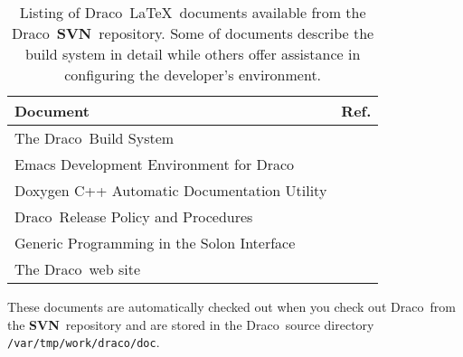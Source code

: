 \documentclass[11pt]{nmemo}
\newcommand{\comp}[1]{\normalfont\footnotesize\texttt{#1}\normalsize}
\newcommand{\draco}{{\normalfont\sffamily Draco}}
\newcommand{\svn}{{\normalfont\bfseries SVN}}
\begin{document}
\begin{table}
  \caption{Listing of \draco\ \LaTeX\ documents available from the
    \draco\ \svn\ repository.  Some of documents describe the build
    system in detail while others offer assistance in configuring the
    developer's environment.}
  \label{tab:draco_docs}
  \begin{center}
    \begin{tabular}{lc} \hline\hline
      \multicolumn{1}{l}{Document} & \multicolumn{1}{c}{Ref.} \\ \hline
      The \draco\ Build System               & ~\cite{draco-build} \\
      Emacs Development Environment for \draco & ~\cite{xtm:9909} \\
      Doxygen C++ Automatic Documentation Utility & ~\cite{doxygen} \\
      \draco\ Release Policy and Procedures  & ~\cite{xtm:9936}    \\
      Generic Programming in the Solon Interface & ~\cite{ro98} \\
      The \draco\ web site                   &  ~\cite{draco-web-site} \\
      \hline\hline
    \end{tabular}
  \end{center}
\end{table}

These documents are automatically checked out when you check out
\draco\ from the \svn\ repository and are stored in the \draco\ source
directory \comp{/var/tmp/work/draco/doc}.  


\end{document}
